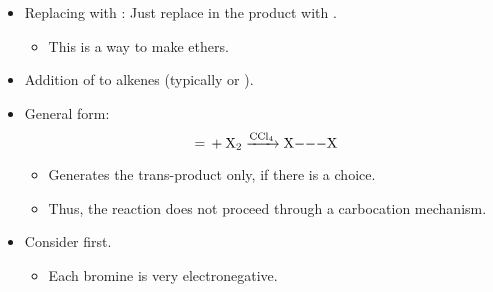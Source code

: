 \documentclass[../notes.tex]{subfiles}
\begin{document}
\begin{itemize}
\begin{figure}[H]
\begin{subfigure}[b]{\linewidth}
                [,0]\+{,,-1em}
                \arrow{<->>}
            \schemestop
            \caption{Third step.}
            \label{fig:acidCatalyzedHydrationd}
        \end{subfigure}
        \caption{Acid-catalyzed hydration mechanism.}
        \label{fig:acidCatalyzedHydration}
    \end{figure}
    \begin{itemize}
        \item Thus, the hydronium ion is a catalyst.
        \item Same regioselectivity --- this is Markovnikov addition.
        \item Same possibility for 1,2-shifts.
        \item Racemic mixture of product since the carbocation is $sp^2$ planar and water has equal probability of attacking both faces.
    \end{itemize}
    \item Replacing  with : Just replace  in the product with .
    \begin{itemize}
        \item This is a way to make ethers.
    \end{itemize}
    \item Addition of  to alkenes (typically  or ).
    \item General form:
    \begin{equation*}
        \ce{= + X2 ->[CCl4] X---X}
    \end{equation*}
    \begin{itemize}
        \item Generates the trans-product only, if there is a choice.
        \item Thus, the reaction does not proceed through a carbocation mechanism.
    \end{itemize}
    \item Consider  first.
    \begin{itemize}
        \item Each bromine is very electronegative.

\end{itemize}
\end{itemize}
\end{document}
